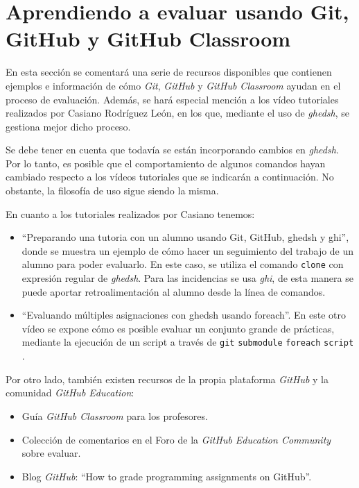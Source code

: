 \section{Aprendiendo a evaluar usando Git, GitHub y GitHub Classroom}
\label{3:sec:6}

En esta sección se comentará una serie de recursos disponibles que contienen ejemplos e información de cómo {\it Git}, {\it GitHub} y {\it GitHub Classroom} ayudan en el proceso de evaluación.
Además, se hará especial mención a los vídeo tutoriales realizados por Casiano Rodríguez León, en los que, mediante el uso de {\it ghedsh}, se gestiona mejor dicho proceso.
\bigskip

Se debe tener en cuenta que todavía se están incorporando cambios en {\it ghedsh}. Por lo tanto, es posible que el comportamiento de algunos comandos hayan cambiado respecto a los vídeos tutoriales que se indicarán a continuación. No obstante,
la filosofía de uso sigue siendo la misma.
\bigskip

En cuanto a los tutoriales realizados por Casiano tenemos:
\begin{itemize}
	\item ``Preparando una tutoria con un alumno usando Git, GitHub, ghedsh y ghi''\cite{B31}, donde se muestra un ejemplo de cómo hacer un seguimiento del trabajo de un alumno para poder evaluarlo. En este caso, se utiliza el comando \verb|clone| con expresión regular
	de {\it ghedsh}. Para las incidencias se usa {\it ghi}, de esta manera se puede aportar retroalimentación al alumno desde la línea de comandos.
	\item ``Evaluando múltiples asignaciones con ghedsh usando foreach''\cite{B32}. En este otro vídeo se expone cómo es posible evaluar un conjunto grande de prácticas, mediante la ejecución de un script a través de \verb|git| \verb|submodule| \verb|foreach| \verb|script| .
\end{itemize}
\bigskip

Por otro lado, también existen recursos de la propia plataforma {\it GitHub} y la comunidad {\it GitHub Education}:
\begin{itemize}
	\item Guía {\it GitHub Classroom} para los profesores\cite{B33}.
	\item Colección de comentarios en el Foro de la {\it GitHub Education Community} sobre evaluar\cite{B34}.
	\item Blog {\it GitHub}: ``How to grade programming assignments on GitHub''\cite{B35}.
\end{itemize}
